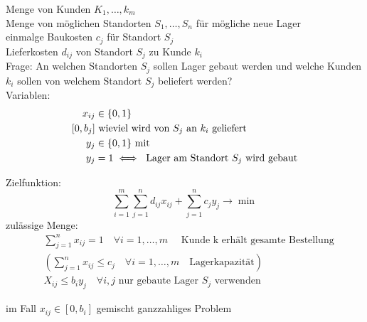 \begin{beispiel}\enter
	Menge von Kunden $K_{1},\dots,k_{m}$\\
	Menge von möglichen Standorten $S_{1},\dots, S_{n}$ für mögliche neue Lager\\
	einmalge Baukosten $c_{j}$ für Standort $S_{j}$\\
	Lieferkosten $d_{ij}$ von Standort $S_{j}$ zu Kunde $k_{i}$\\
	Frage: An welchen Standorten $S_{j}$ sollen Lager gebaut werden und welche Kunden $k_{i}$ sollen von welchem Standort $S_{j}$ beliefert werden?\\
	Variablen:
	\begin{align*}
		x_{ij}&\in \{0,1\} \\
		\left[0,b_{j} \right]& \text{ wieviel wird von $S_{j}$ an $k_{i}$ geliefert}\\
		y_{j} &\in \{0,1\}\text{ mit }  \\
		y_{j}& = 1 \iff \text{ Lager am Standort $ S_{j}$ wird gebaut}
	\end{align*} 

	Zielfunktion: 
	\begin{equation*}
		\sum_{i=1}^{m} \sum_{j=1}^{n}  d_{ij}x_{ij} + \sum_{j=1}^{n} c_{j}y_{j} \rightarrow \min
	\end{equation*} 
	zulässige Menge:	
	\begin{align*}
		&\sum_{j=1}^{n} x_{ij} =1 \quad \forall i=1,\dots, m\quad \text{ Kunde k erhält gesamte Bestellung}\\
		&\left(\sum_{j=1}^{n} x_{ij} \leq c_{j} \quad \forall i=1,\dots, m \quad \text{Lagerkapazität}\right)\\
		&X_{ij} \leq b_{i}y_{j} \quad \forall i,j \text{ nur gebaute Lager $S_{j}$ verwenden}
	\end{align*} 

	im Fall $x_{ij} \in [0,b_{i}]$ gemischt ganzzahliges Problem

\end{beispiel}

